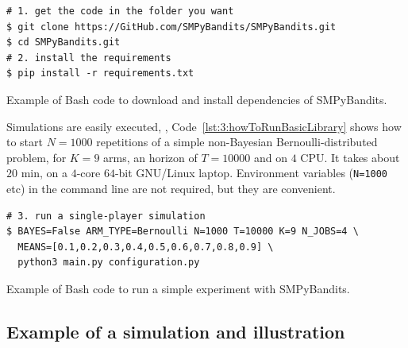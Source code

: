 \begin{small}
    \begin{listing}[h!]
        \begin{verbatim}
# 1. get the code in the folder you want
$ git clone https://GitHub.com/SMPyBandits/SMPyBandits.git
$ cd SMPyBandits.git
# 2. install the requirements
$ pip install -r requirements.txt
        \end{verbatim}
        \caption{Example of Bash code to download and install dependencies of SMPyBandits.}
        \label{lst:3:howToInstallLibrary}
    \end{listing}
\end{small}

Simulations are easily executed, \eg, Code~\ref{lst:3:howToRunBasicLibrary} shows how to start $N=1000$ repetitions of a simple non-Bayesian Bernoulli-distributed problem, for $K=9$ arms, an horizon of $T=10000$ and on $4$ CPU.
It takes about $20$ min, on a $4$-core $64$-bit GNU/Linux laptop.
Environment variables (\texttt{N=1000} etc) in the command line are not required, but they are convenient.

\begin{small}
\begin{listing}[h!]
    \begin{verbatim}
# 3. run a single-player simulation
$ BAYES=False ARM_TYPE=Bernoulli N=1000 T=10000 K=9 N_JOBS=4 \
  MEANS=[0.1,0.2,0.3,0.4,0.5,0.6,0.7,0.8,0.9] \
  python3 main.py configuration.py
    \end{verbatim}
    \caption{Example of Bash code to run a simple experiment with SMPyBandits.}
    \label{lst:3:howToRunBasicLibrary}
\end{listing}
\end{small}


\subsection{Example of a simulation and illustration}

